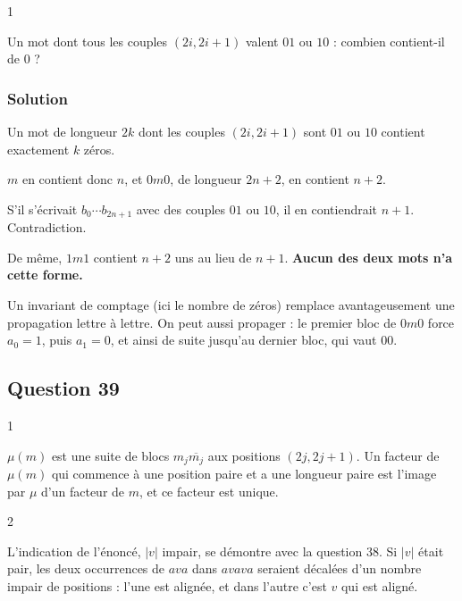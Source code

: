 \documentclass[11pt,a4paper]{article}
\begin{document}
\begin{indication}{1}

Un mot dont tous les couples \((2i,2i+1)\) valent \(01\) ou \(10\) : combien contient-il de \(0\) ?

\end{indication}

\hypertarget{solution-37}{%
\subsubsection{Solution}\label{solution-37}}

Un mot de longueur \(2k\) dont les couples \((2i,2i+1)\) sont \(01\) ou \(10\) contient exactement \(k\) zéros.

\(m\) en contient donc \(n\), et \(0m0\), de longueur \(2n+2\), en contient \(n+2\).

S'il s'écrivait \(b_0\cdots b_{2n+1}\) avec des couples \(01\) ou \(10\), il en contiendrait \(n+1\). Contradiction.

De même, \(1m1\) contient \(n+2\) uns au lieu de \(n+1\). \textbf{Aucun des deux mots n'a cette forme.}

\begin{methode}

Un invariant de comptage (ici le nombre de zéros) remplace avantageusement une propagation lettre à lettre. On peut aussi propager : le premier bloc de \(0m0\) force \(a_0=1\), puis \(a_1=0\), et ainsi de suite jusqu'au dernier bloc, qui vaut \(00\).

\end{methode}

\hypertarget{question-39}{%
\subsection{Question 39}\label{question-39}}

\begin{indication}{1}

\(\mu(m)\) est une suite de blocs \(m_j\overline{m_j}\) aux positions \((2j,2j+1)\). Un facteur de \(\mu(m)\) qui commence à une position paire et a une longueur paire est l'image par \(\mu\) d'un facteur de \(m\), et ce facteur est unique.

\end{indication}

\begin{indication}{2}

L'indication de l'énoncé, \(|v|\) impair, se démontre avec la question 38. Si \(|v|\) était pair, les deux occurrences de \(ava\) dans \(avava\) seraient décalées d'un nombre impair de positions : l'une est alignée, et dans l'autre c'est \(v\) qui est aligné.

\end{indication}
\end{document}
